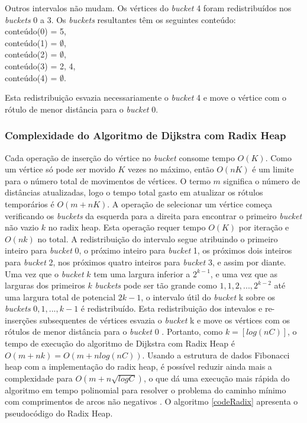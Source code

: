 Outros intervalos não mudam. Os vértices do \textit{bucket} 4 foram redistribuídos nos \textit{buckets} 0 a 3.
Os \textit{buckets} resultantes têm os seguintes conteúdo:\\
conteúdo(0) = {5},\\
conteúdo(1) = $\emptyset$,\\
conteúdo(2) = $\emptyset$,\\
conteúdo(3) = {2, 4},\\
conteúdo(4) = $\emptyset$.

Esta redistribuição esvazia necessariamente o \textit{bucket} 4 e move o vértice com o rótulo de menor distância para o \textit{bucket} 0.

\subsubsection{Complexidade do Algoritmo de Dijkstra com Radix Heap}
Cada operação de inserção do vértice no \textit{bucket} consome tempo $O(K)$.
Como um vértice só pode ser movido $K$ vezes no máximo, então $O(nK)$ é um limite para o número total de movimentos
de vértices.
O termo $m$ significa o número de distâncias atualizadas, logo o tempo total gasto em atualizar os rótulos temporários
é $O(m + nK)$.
A operação de selecionar um vértice começa verificando os \textit{buckets} da esquerda para a direita para encontrar
o primeiro \textit{bucket} não vazio $k$ no radix heap. Esta operação requer tempo $O(K)$ por iteração e $O(nk)$ no total.
A redistribuição do intervalo segue atribuindo o primeiro inteiro para \textit{bucket} 0, o próximo inteiro para \textit{bucket} 1,
os próximos dois inteiros para \textit{bucket} 2, nos próximos quatro inteiros para \textit{bucket} 3, e assim por diante.
Uma vez que o \textit{bucket} $k$ tem uma largura inferior a $2^{k - 1}$, e uma vez que as larguras dos primeiros $k$ \textit{buckets}
pode ser tão grande como $1, 1, 2, ..., 2^{k - 2}$ até uma largura total de potencial $2k - 1$,
o intervalo útil do \textit{bucket} k sobre os \textit{buckets} $0, 1, ..., k - 1$ é redistribuído.
Esta redistribuição dos intevalos e re-inserções subsequentes de vértices esvazia o \textit{bucket} k e move os vértices com
os rótulos de menor distância para o \textit{bucket} 0 \cite{bookahuja}.
Portanto, como $k = [log(nC)]$, o tempo de execução do algoritmo de Dijkstra com Radix Heap é $O(m + nk) = O(m + n log(nC))$.
Usando a estrutura de dados Fibonacci heap com a implementação do radix heap, é possível reduzir ainda mais a complexidade
para $O(m + n\sqrt{logC})$, o que dá uma execução mais rápida do algoritmo em tempo polinomial para resolver
o problema do caminho mínimo com comprimentos de arcos não negativos \cite{ahuja}.
O algoritmo \ref{codeRadix} apresenta o pseudocódigo do Radix Heap.

